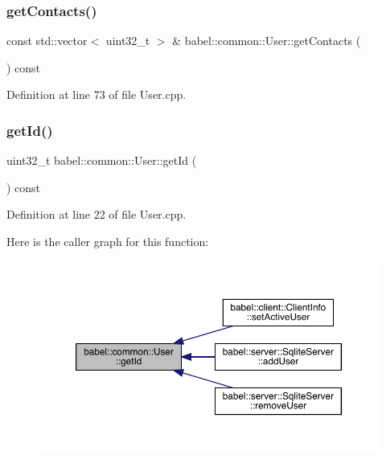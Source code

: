 \subsubsection{\texorpdfstring{get\+Contacts()}{getContacts()}}
{\footnotesize\ttfamily const std\+::vector$<$ uint32\+\_\+t $>$ \& babel\+::common\+::\+User\+::get\+Contacts (\begin{DoxyParamCaption}{ }\end{DoxyParamCaption}) const}



Definition at line 73 of file User.\+cpp.

\mbox{\label{classbabel_1_1common_1_1_user_accd1833b33a6e7429ad2d43a28e1116a}} 
\subsubsection{\texorpdfstring{get\+Id()}{getId()}}
{\footnotesize\ttfamily uint32\+\_\+t babel\+::common\+::\+User\+::get\+Id (\begin{DoxyParamCaption}{ }\end{DoxyParamCaption}) const}



Definition at line 22 of file User.\+cpp.

Here is the caller graph for this function\+:\nopagebreak
\begin{figure}[H]
\begin{center}
\leavevmode
\includegraphics[width=350pt]{classbabel_1_1common_1_1_user_accd1833b33a6e7429ad2d43a28e1116a_icgraph}
\end{center}
\end{figure}
\mbox{\label{classbabel_1_1common_1_1_user_a9e4935028bc942da08a2eafcd4b0008b}} 
